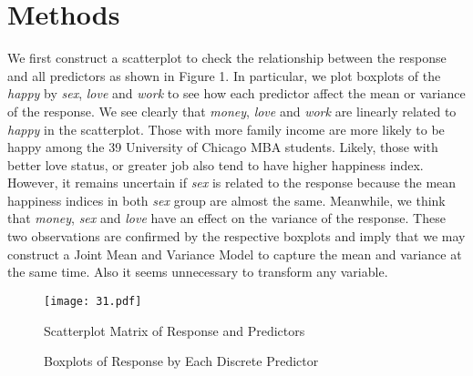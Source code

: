 \documentclass[11pt,letterpaper]{article}
\begin{document}
\section{Methods}
We first construct a scatterplot to check the relationship between the response and all predictors as shown in Figure 1. In particular, we plot boxplots of the \emph{happy} by \emph{sex}, \emph{love} and \emph{work} to see how each predictor affect the mean or variance of the response. We see clearly that \emph{money}, \emph{love} and \emph{work} are linearly related to \emph{happy} in the scatterplot. Those with more family income are more likely to be happy among the 39 University of Chicago MBA students. Likely, those with better love status, or greater job also tend to have higher happiness index. However, it remains uncertain if \emph{sex} is related to the response because the mean happiness indices in both \emph{sex} group are almost the same. Meanwhile, we think that \emph{money}, \emph{sex} and \emph{love} have an effect on the variance of the response. These two observations are confirmed by the respective boxplots and imply that we may construct a Joint Mean and Variance Model to capture the mean and variance at the same time. Also it seems unnecessary to transform any variable. \par
\begin{figure}[htbp]
\begin{center}
\texttt{[image: 31.pdf]}
\end{center}
\caption{Scatterplot Matrix of Response and Predictors}
\end{figure}
\begin{center}
\begin{figure}[htbp]
\caption{Boxplots of Response by Each Discrete Predictor}
\end{figure}
\end{center}
\end{document}
